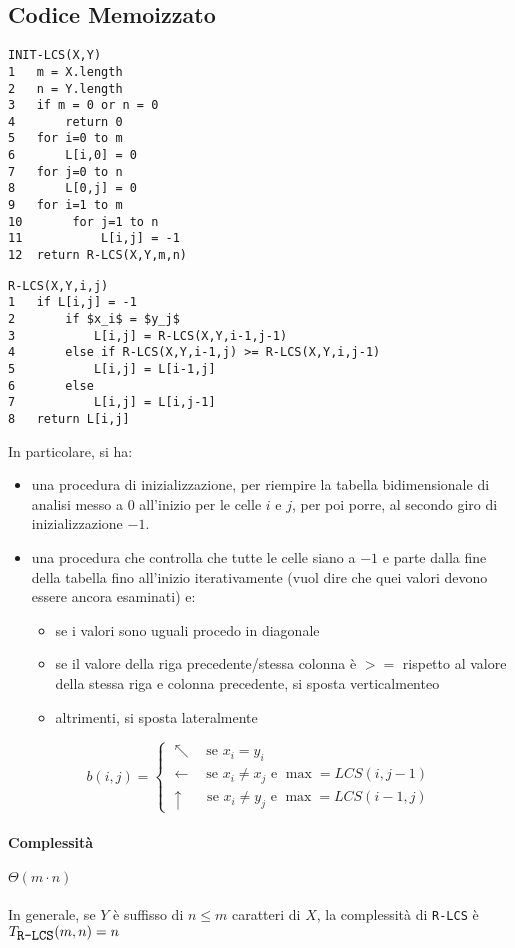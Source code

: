 \subsection{Codice Memoizzato}
\begin{mdframed}
\begin{lstlisting}[mathescape=true]
INIT-LCS(X,Y)
1   m = X.length
2   n = Y.length
3   if m = 0 or n = 0
4       return 0
5   for i=0 to m
6       L[i,0] = 0
7   for j=0 to n
8       L[0,j] = 0
9   for i=1 to m
10       for j=1 to n
11           L[i,j] = -1
12  return R-LCS(X,Y,m,n)
\end{lstlisting}
\end{mdframed}
\begin{mdframed}
\begin{lstlisting}[mathescape=true]
R-LCS(X,Y,i,j)
1   if L[i,j] = -1
2       if $x_i$ = $y_j$
3           L[i,j] = R-LCS(X,Y,i-1,j-1)
4       else if R-LCS(X,Y,i-1,j) >= R-LCS(X,Y,i,j-1)
5           L[i,j] = L[i-1,j]
6       else
7           L[i,j] = L[i,j-1]
8   return L[i,j]
\end{lstlisting}
\end{mdframed}
In particolare, si ha:
\begin{itemize}
    \item una procedura di inizializzazione, per riempire la tabella bidimensionale di analisi messo a $0$ all'inizio per le celle $i$ e $j$, per poi porre, al secondo giro di inizializzazione $-1$.
    \item una procedura che controlla che tutte le celle siano a $-1$ e parte dalla fine della tabella fino all'inizio iterativamente (vuol dire che quei valori devono essere ancora esaminati) e:
    \begin{itemize}
        \item se i valori sono uguali procedo in diagonale
        \item se il valore della riga precedente/stessa colonna è $>=$ rispetto al valore della stessa riga e colonna precedente, si sposta verticalmenteo
        \item altrimenti, si sposta lateralmente
    \end{itemize}
\end{itemize}
\begin{equation*}
    b(i,j) =
    \begin{cases}
        \nwarrow \quad \text{se } x_i = y_i \\
        \leftarrow \quad \text{se } x_i \not= x_j \text{ e } \max = LCS(i,j-1) \\
        \uparrow \quad\;\; \text{se } x_i \not= y_j \text{ e } \max = LCS(i-1,j)
    \end{cases}
\end{equation*}
\paragraph{Complessità} $\Theta(m \cdot n)$ \\~\\
In generale, se $Y$ è suffisso di $n \leq m$ caratteri di $X$, la complessità di \verb|R-LCS| è $T_{\verb|R-LCS|}(m,n) = n$

\newpage